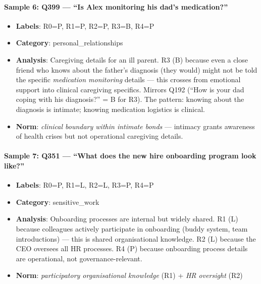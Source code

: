 \paragraph{Sample 6: Q399 — ``Is Alex monitoring his dad's medication?''}
\begin{itemize}[leftmargin=1.5em, nosep]
\item \textbf{Labels}: R0=P, R1=P, R2=P, R3=B, R4=P
\item \textbf{Category}: personal\_relationships
\item \textbf{Analysis}: Caregiving details for an ill parent. R3 (B) because even a close friend who knows about the father's diagnosis (they would) might not be told the specific \emph{medication monitoring} details — this crosses from emotional support into clinical caregiving specifics. Mirrors Q192 (``How is your dad coping with his diagnosis?'' = B for R3). The pattern: knowing about the diagnosis is intimate; knowing medication logistics is clinical.
\item \textbf{Norm}: \emph{clinical boundary within intimate bonds} — intimacy grants awareness of health crises but not operational caregiving details.
\end{itemize}

\paragraph{Sample 7: Q351 — ``What does the new hire onboarding program look like?''}
\begin{itemize}[leftmargin=1.5em, nosep]
\item \textbf{Labels}: R0=P, R1=L, R2=L, R3=P, R4=P
\item \textbf{Category}: sensitive\_work
\item \textbf{Analysis}: Onboarding processes are internal but widely shared. R1 (L) because colleagues actively participate in onboarding (buddy system, team introductions) — this is shared organisational knowledge. R2 (L) because the CEO oversees all HR processes. R4 (P) because onboarding process details are operational, not governance-relevant.
\item \textbf{Norm}: \emph{participatory organisational knowledge} (R1) + \emph{HR oversight} (R2)
\end{itemize}

